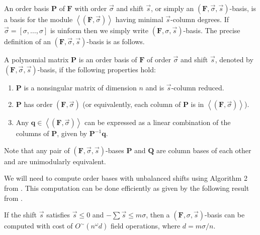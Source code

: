 An order basis \cite{BeLa94,BL1997} $\mathbf{P}$ of $\mathbf{F}$
with order $\vec{\sigma}$ and shift $\vec{s}$, or simply an $\left(\mathbf{F},\vec{\sigma},\vec{s}\right)$-basis,
is a basis for the module $\left\langle \left(\mathbf{F},\vec{\sigma}\right)\right\rangle $
having minimal $\vec{s}$-column degrees. If $\vec{\sigma}=\left[\sigma,\dots,\sigma\right]$
is uinform then we simply write $\left(\mathbf{F},\sigma,\vec{s}\right)$-basis.
The precise definition of an $\left(\mathbf{F},\vec{\sigma},\vec{s}\right)$-basis
is as follows. 
\begin{defn}
\label{def:orderBasis}A polynomial matrix $\mathbf{P}$ is an order
basis of $\mathbf{F}$ of order $\vec{\sigma}$ and shift $\vec{s}$,
denoted by $\left(\mathbf{F},\vec{\sigma},\vec{s}\right)$-basis,
if the following properties hold: 
\begin{enumerate}
\item $\mathbf{P}$ is a nonsingular matrix of dimension $n$ and is $\vec{s}$-column
reduced. 
\item $\mathbf{P}$ has order $\left(\mathbf{F},\vec{\sigma}\right)$ (or
equivalently, each column of $\mathbf{P}$ is in $\left\langle (\mathbf{F},\vec{\sigma})\right\rangle $). 
\item Any $\mathbf{q}\in\left\langle \left(\mathbf{F},\vec{\sigma}\right)\right\rangle $
can be expressed as a linear combination of the columns of $\mathbf{P}$,
given by $\mathbf{P}^{-1}\mathbf{q}$. 
\end{enumerate}
\end{defn}


Note that any pair of $\left(\mathbf{F},\vec{\sigma},\vec{s}\right)$-bases
$\mathbf{P}$ and $\mathbf{Q}$ are column bases of each other and
are unimodularly equivalent.

We will need to compute order bases with unbalanced shifts using Algorithm
2 from \cite{za2009}. This computation can be done efficiently as
given by the following result from \cite{za2009}.
\begin{thm}
\label{thm:unbalancedOrderBasisCost}If the shift $\vec{s}$ satisfies
$\vec{s}\le0$ and $-\sum\vec{s}\le m\sigma$, then a $\left(\mathbf{F},\sigma,\vec{s}\right)$-basis
can be computed with cost of $O^{\sim}(n^{\omega}d)$ field operations,
where $d=m\sigma/n$. 
\end{thm}

